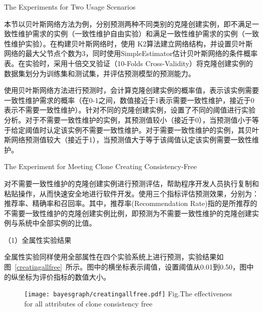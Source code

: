 {The Experiments for Two Usage Scenarios}

本节以贝叶斯网络方法为例，分别预测两种不同类别的克隆创建实例，即不满足一致性维护需求的实例（一致性维护自由实验）和满足一致性维护需求的实例（一致性维护实验）。在构建贝叶斯网络时，使用 K2算法建立网络结构，并设置贝叶斯网络的最大父节点个数为3，同时使用SimpleEstimator估计贝叶斯网络的条件概率表。在实验时，采用十倍交叉验证（10-Folds Cross-Validity）将克隆创建实例的数据集划分为训练集和测试集，并评估预测模型的预测能力。

使用贝叶斯网络方法进行预测时，会计算克隆创建实例的概率值，表示该实例需要一致性维护需求的概率（在0-1之间，数值接近于1表示需要一致性维护，接近于0表示不需要一致性维护）。针对不同的克隆创建实例，设置了不同的阈值进行实验分析。对于不需要一致性维护的实例，其预测值较小（接近于0），当预测值小于等于给定阈值时认定该实例不需要一致性维护。对于需要一致性维护的实例，其贝叶斯网络预测值较大（接近于1），当预测值大于等于该阈值认定该实例需要一致性维护。

{The Experiment for Meeting Clone Creating Consistency-Free}

对不需要一致性维护的克隆创建实例进行预测评估，帮助程序开发人员执行复制和粘贴操作，从而快速安全地进行软件开发。使用三个指标评估预测效果，分别为：推荐率、精确率和召回率。其中，推荐率(Recommendation Rate)指的是所推荐的不需要一致性维护的克隆创建实例比例，即预测为不需要一致性维护的克隆创建实例与系统中全部实例的比值。


（1）全属性实验结果

全属性实验同样使用全部属性在四个实验系统上进行预测，实验结果如图~\ref{creatingallfree}~所示。图中的横坐标表示阈值，设置阈值从0.01到0.50，图中的纵坐标为评价指标的数值大小。

\begin{figure}[h]
\centering
\texttt{[image: bayesgraph/creatingallfree.pdf]}
{Fig.$\!$}{The effectiveness for all attributes of clone consistency free}
\vspace{-1em}
\end{figure}

